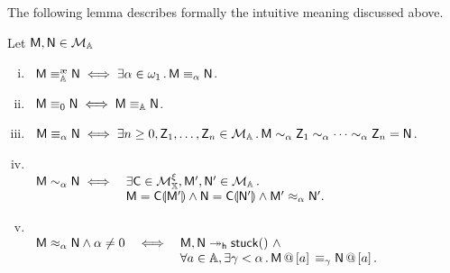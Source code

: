 The following lemma describes formally the intuitive meaning discussed above.
\begin{lem}\label{lem:relalphaprops}
Let $\mM,\mN\in\cM$
\begin{enumerate}[(i)]
\item\label{lem:relalphaprops1}\
	 $\mM\equivea\mN\iff\exists\alpha\in\Count\,.\,\mM\eq\mN$.
\item\label{lem:relalphaprops2}\
	$\mM\eq[0]\mN\iff\mM\equiv_\Addrs\mN$.
\item\label{lem:relalphaprops3}\
	$\mM\eq \mN\iff\exists n\ge0, \mZ_1,\dots,\mZ_n\in\cM\,.\, \mM\svirg\mZ_1\svirg\cdots\svirg\mZ_n =\mN$.
\item\label{lem:relalphaprops4}~\\[-3ex]
$
	\begin{array}{ll}
		\mM\svirg\mN\iff&\exists \mach{C}\in\cMX,\mach{M}',\mach{N}'\in\cM\,.\,\\
		&\mM=\mach{C}\hole{\mM'}\land\mN = \mach{C}\hole{\mN'} \land \mM'\pesc\mN'.\\
		\end{array}
	$
\item\label{lem:relalphaprops5}~\\[-2.7ex]
$
	\begin{array}{lcl}
		\mM\pesc\mN\land \alpha\neq 0&\iff&\mM,\mN\reddh\stuck{}\ \land\\
		&&\forall a\in\Addrs,\exists\gamma<\alpha\,.\, \append{\mM}{a}\eq[\gamma]\append{\mN}{a}.\\
		\end{array}
	$
\end{enumerate}
\end{lem}

